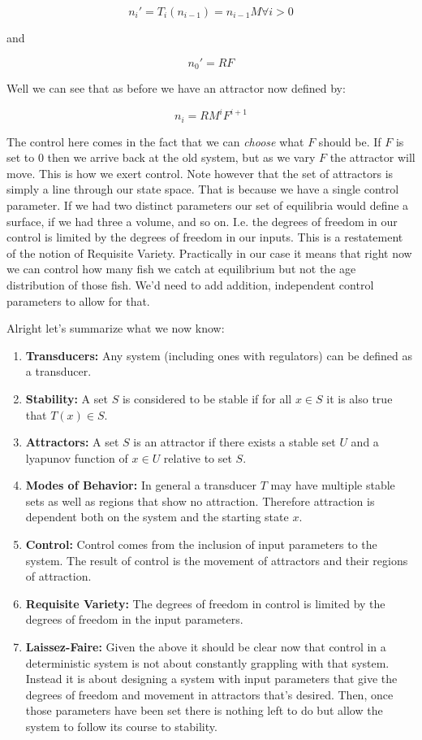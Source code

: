 \documentclass[11pt,a5paper]{article}
\begin{document}
$$n_i'=T_i(n_{i-1})=n_{i-1}M \forall i > 0$$

and

$$n_0'=RF$$

Well we can see that as before we have an attractor now defined by:

$$n_i=RM^iF^{i+1}$$

The control here comes in the fact that we can \textit{choose} what $F$ should be. If $F$ is set to 0 then we arrive back at the old system, but as we vary $F$ the attractor will move. This is how we exert control. Note however that the set of attractors is simply a line through our state space. That is because we have a single control parameter. If we had two distinct parameters our set of equilibria would define a surface, if we had three a volume, and so on. I.e. the degrees of freedom in our control is limited by the degrees of freedom in our inputs. This is a restatement of the notion of Requisite Variety\cite{cybernetics}. Practically in our case it means that right now we can control how many fish we catch at equilibrium but not the age distribution of those fish. We'd need to add addition, independent control parameters to allow for that. \newline

Alright let's summarize what we now know:

\begin{enumerate}
\item \textbf{Transducers:} Any system (including ones with regulators) can be defined as a transducer.
\item \textbf{Stability:} A set $S$ is considered to be stable if for all $x\in S$ it is also true that $T(x)\in S$.
\item \textbf{Attractors:} A set $S$ is an attractor if there exists a stable set $U$ and a lyapunov function of $x\in U$ relative to set $S$. 
\item \textbf{Modes of Behavior:} In general a transducer $T$ may have multiple stable sets as well as regions that show no attraction. Therefore attraction is dependent both on the system and the starting state $x$. 
\item \textbf{Control:} Control comes from the inclusion of input parameters to the system. The result of control is the movement of attractors and their regions of attraction. 
\item \textbf{Requisite Variety:} The degrees of freedom in control is limited by the degrees of freedom in the input parameters. 
\item \textbf{Laissez-Faire:} Given the above it should be clear now that control in a deterministic system is not about constantly grappling with that system. Instead it is about designing a system with input parameters that give the degrees of freedom and movement in attractors that's desired. Then, once those parameters have been set there is nothing left to do but allow the system to follow its course to stability. 
\end{enumerate}
\end{document}
